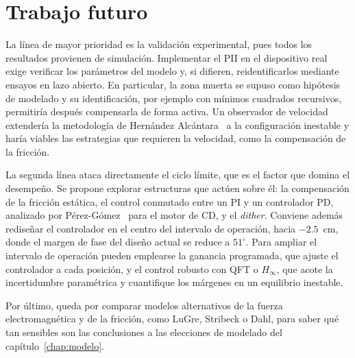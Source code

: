 \section{Trabajo futuro}

La línea de mayor prioridad es la validación experimental, pues todos los resultados provienen de simulación. Implementar el PII en el dispositivo real exige verificar los parámetros del modelo y, si difieren, reidentificarlos mediante ensayos en lazo abierto. En particular, la zona muerta se supuso como hipótesis de modelado y su identificación, por ejemplo con mínimos cuadrados recursivos, permitiría después compensarla de forma activa. Un observador de velocidad extendería la metodología de Hernández Alcántara~\cite{diana_tesis} a la configuración inestable y haría viables las estrategias que requieren la velocidad, como la compensación de la fricción.

La segunda línea ataca directamente el ciclo límite, que es el factor que domina el desempeño. Se propone explorar estructuras que actúen sobre él: la compensación de la fricción estática, el control conmutado entre un PI y un controlador PD, analizado por Pérez-Gómez~\cite{perez} para el motor de CD, y el \emph{dither}. Conviene además rediseñar el controlador en el centro del intervalo de operación, hacia $-2.5$~cm, donde el margen de fase del diseño actual se reduce a $51^\circ$. Para ampliar el intervalo de operación pueden emplearse la ganancia programada, que ajuste el controlador a cada posición, y el control robusto con QFT o $H_\infty$, que acote la incertidumbre paramétrica y cuantifique los márgenes en un equilibrio inestable.

Por último, queda por comparar modelos alternativos de la fuerza electromagnética y de la fricción, como LuGre, Stribeck o Dahl, para saber qué tan sensibles son las conclusiones a las elecciones de modelado del capítulo~\ref{chap:modelo}.
